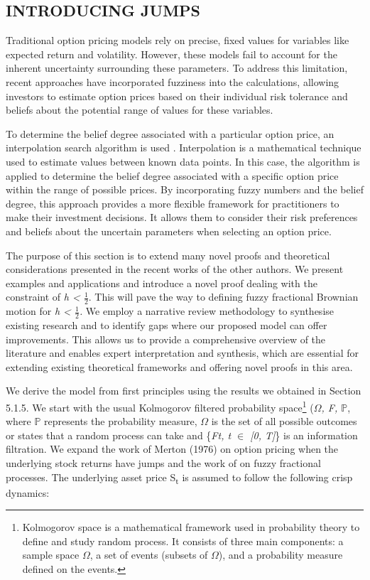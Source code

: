 \documentclass[12pt,a4paper]{report}
\numberwithin{equation}{section}
\begin{document}
\hypertarget{introducing--jumps}{%
\subsection{INTRODUCING JUMPS}\label{introducing--jumps}}

Traditional option pricing models rely on precise, fixed values for
variables like expected return and volatility. However, these models
fail to account for the inherent uncertainty surrounding these
parameters. To address this limitation, recent approaches have
incorporated fuzziness into the calculations, allowing investors to
estimate option prices based on their individual risk tolerance and
beliefs about the potential range of values for these variables.

To determine the belief degree associated with a particular option
price, an interpolation search algorithm is used \cite{zhang2021pricing_92}. Interpolation
is a mathematical technique used to estimate values between known data
points. In this case, the algorithm is applied to determine the belief
degree associated with a specific option price within the range of
possible prices. By incorporating fuzzy numbers and the belief degree,
this approach provides a more flexible framework for practitioners to
make their investment decisions. It allows them to consider their risk
preferences and beliefs about the uncertain parameters when selecting an
option price.

The purpose of this section is to extend many novel proofs and
theoretical considerations presented in the recent works of the other
authors. We present examples and applications and introduce a novel
proof dealing with the constraint of \emph{h \textless{} $\frac{1}{2}$}. This will
pave the way to defining fuzzy fractional Brownian motion for \emph{h
\textless{} $\frac{1}{2}$.} We employ a narrative review methodology to synthesise
existing research and to identify gaps where our proposed model can
offer improvements. This allows us to provide a comprehensive overview
of the literature and enables expert interpretation and synthesis, which
are essential for extending existing theoretical frameworks and offering
novel proofs in this area.

We derive the model from first principles using the results we obtained
in Section 5.1.5. We start with the usual Kolmogorov filtered
probability space\footnote{Kolmogorov space is a mathematical framework
  used in probability theory to define and study random process. It
  consists of three main components: a sample space $\Omega$, a set of events (subsets
  of $\Omega$), and a probability measure defined on the events.} (\emph{$\Omega$, F, $\mathbb{P}$}, where \emph{$\mathbb{P}$} represents the probability measure, \emph{$\Omega$} is the
set of all possible outcomes or states that a random process can take
and \{\emph{Ft, t $\in$ {[}0, T{]}}\} is an information filtration. We
expand the work of Merton (1976) on option pricing when the underlying
stock returns have jumps \cite{merton1976option_93} and the work of \cite{zhang2021pricing_92} on fuzzy
fractional processes. The underlying asset price S\textsubscript{t} is
assumed to follow the following crisp dynamics:
\end{document}
